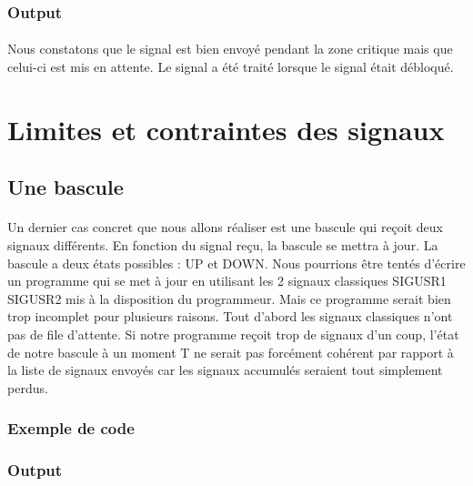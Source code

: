 \documentclass{article}
\begin{document}
\subsubsection*{Output}



\paragraph{} Nous constatons que le signal est bien envoyé pendant la zone critique mais que celui-ci est mis en attente. Le signal a été traité lorsque le signal était débloqué.

\section{Limites et contraintes des signaux}

\subsection{Une bascule}

\paragraph{} Un dernier cas concret que nous allons réaliser est une bascule qui reçoit deux signaux différents. En fonction du signal reçu, la bascule se mettra à jour. 
La bascule a deux états possibles : UP et DOWN. Nous pourrions être tentés d'écrire un programme qui se met à jour en utilisant les 2 signaux classiques SIGUSR1 SIGUSR2 mis à la 
disposition du programmeur. Mais ce programme serait bien trop incomplet pour plusieurs raisons.
Tout d'abord les signaux classiques n'ont pas de file d'attente. Si notre programme reçoit trop de signaux d'un coup, l'état de notre bascule à un moment T ne serait pas forcément 
cohérent par rapport à la liste de signaux envoyés car les signaux accumulés seraient tout simplement perdus.

\subsubsection*{Exemple de code}



\subsubsection*{Output}
\end{document}
